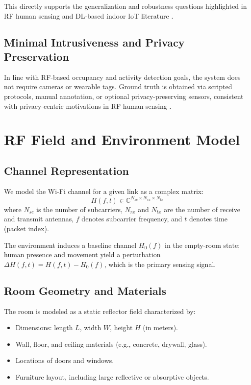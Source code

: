 \documentclass[11pt,a4paper]{article}
\begin{document}
This directly supports the generalization and robustness questions highlighted in RF human sensing and DL-based indoor IoT literature \cite{shahbazian2023human,abdelbasset2021indoor}.

\subsection{Minimal Intrusiveness and Privacy Preservation}

In line with RF-based occupancy and activity detection goals, the system does not require cameras or wearable tags. Ground truth is obtained via scripted protocols, manual annotation, or optional privacy-preserving sensors, consistent with privacy-centric motivations in RF human sensing \cite{shahbazian2023human}.

\section{RF Field and Environment Model}

\subsection{Channel Representation}

We model the Wi-Fi channel for a given link as a complex matrix:
\[
H(f,t) \in \mathbb{C}^{N_{sc} \times N_{rx} \times N_{tx}}
\]
where $N_{sc}$ is the number of subcarriers, $N_{rx}$ and $N_{tx}$ are the number of receive and transmit antennas, $f$ denotes subcarrier frequency, and $t$ denotes time (packet index).

The environment induces a baseline channel $H_0(f)$ in the empty-room state; human presence and movement yield a perturbation $\Delta H(f,t) = H(f,t) - H_0(f)$, which is the primary sensing signal.

\subsection{Room Geometry and Materials}

The room is modeled as a static reflector field characterized by:

\begin{itemize}[leftmargin=*]
\item Dimensions: length $L$, width $W$, height $H$ (in meters).
\item Wall, floor, and ceiling materials (e.g., concrete, drywall, glass).
\item Locations of doors and windows.
\item Furniture layout, including large reflective or absorptive objects.
\end{itemize}
\end{document}
